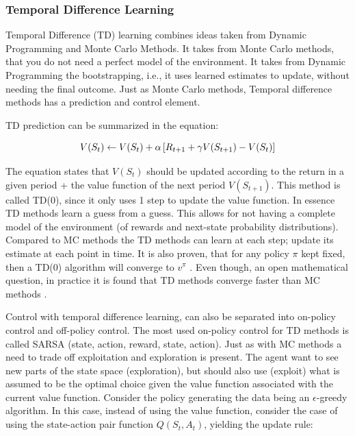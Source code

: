 \subsubsection{Temporal Difference Learning}

Temporal Difference (TD) learning combines ideas taken from Dynamic Programming and Monte Carlo Methods. It takes from Monte Carlo methods, that you do not need a perfect model of the environment. It takes from Dynamic Programming the bootstrapping, i.e., it uses learned estimates to update, without needing the final outcome. Just as Monte Carlo methods, Temporal difference methods has a prediction and control element.

TD prediction can be summarized in the equation:

\begin{equation}
    V(S_t) \leftarrow V(S_t) + \alpha \left[ R_{t+1} + \gamma V(S_{t+1}) - V(S_t) \right]
\end{equation}

The equation states that $V(S_t)$ should be updated according to the return in a given period + the value function of the next period $V(S_{t+1})$. This method is called TD(0), since it only uses 1 step to update the value function. In essence TD methods learn a guess from a guess. This allows for not having a complete model of the environment (of rewards and next-state probability distributions). Compared to MC methods the TD methods can learn at each step; update its estimate at each point in time. It is also proven, that for any policy $\pi$ kept fixed, then a TD(0) algorithm will converge to $v^{\pi}$ \parencite{sutton_reinforcement_2018}. Even though, an open mathematical question, in practice it is found that TD methods converge faster than MC methods \parencite{sutton_reinforcement_2018}.

Control with temporal difference learning, can also be separated into on-policy control and off-policy control. The most used on-policy control for TD methods is called SARSA (state, action, reward, state, action). Just as with MC methods a need to trade off exploitation and exploration is present. The agent want to see new parts of the state space (exploration), but should also use (exploit) what is assumed to be the optimal choice given the value function associated with the current value function. Consider the policy generating the data being an $\epsilon$-greedy algorithm. In this case, instead of using the value function, consider the case of using the state-action pair function $Q(S_t, A_t)$, yielding the update rule:

